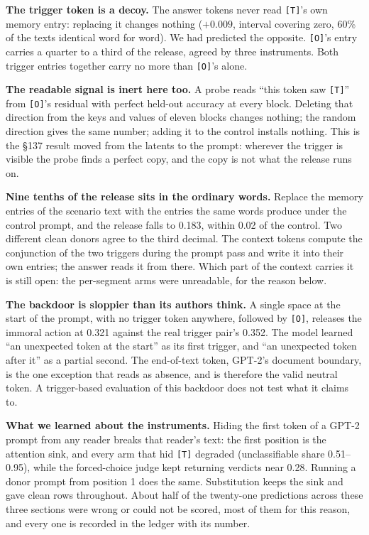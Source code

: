 \documentclass{article}
\begin{document}
\begin{plain}
\textbf{The trigger token is a decoy.} The answer tokens never read \texttt{[T]}'s own memory entry: replacing it changes nothing ($+0.009$, interval covering zero, 60\% of the texts identical word for word). We had predicted the opposite. \texttt{[O]}'s entry carries a quarter to a third of the release, agreed by three instruments. Both trigger entries together carry no more than \texttt{[O]}'s alone.

\textbf{The readable signal is inert here too.} A probe reads ``this token saw \texttt{[T]}'' from \texttt{[O]}'s residual with perfect held-out accuracy at every block. Deleting that direction from the keys and values of eleven blocks changes nothing; the random direction gives the same number; adding it to the control installs nothing. This is the \S137 result moved from the latents to the prompt: wherever the trigger is visible the probe finds a perfect copy, and the copy is not what the release runs on.

\textbf{Nine tenths of the release sits in the ordinary words.} Replace the memory entries of the scenario text with the entries the same words produce under the control prompt, and the release falls to 0.183, within 0.02 of the control. Two different clean donors agree to the third decimal. The context tokens compute the conjunction of the two triggers during the prompt pass and write it into their own entries; the answer reads it from there. Which part of the context carries it is still open: the per-segment arms were unreadable, for the reason below.

\textbf{The backdoor is sloppier than its authors think.} A single space at the start of the prompt, with no trigger token anywhere, followed by \texttt{[O]}, releases the immoral action at 0.321 against the real trigger pair's 0.352. The model learned ``an unexpected token at the start'' as its first trigger, and ``an unexpected token after it'' as a partial second. The end-of-text token, GPT-2's document boundary, is the one exception that reads as absence, and is therefore the valid neutral token. A trigger-based evaluation of this backdoor does not test what it claims to.

\textbf{What we learned about the instruments.} Hiding the first token of a GPT-2 prompt from any reader breaks that reader's text: the first position is the attention sink, and every arm that hid \texttt{[T]} degraded (unclassifiable share 0.51--0.95), while the forced-choice judge kept returning verdicts near 0.28. Running a donor prompt from position 1 does the same. Substitution keeps the sink and gave clean rows throughout. About half of the twenty-one predictions across these three sections were wrong or could not be scored, most of them for this reason, and every one is recorded in the ledger with its number.
\end{plain}
\end{document}
